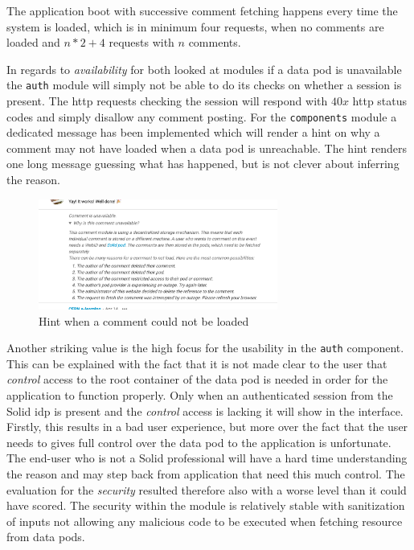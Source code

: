 The application boot with successive comment fetching happens every time the system is loaded, which is in minimum four requests, when no comments are loaded and $n*2+4$ requests with $n$ comments.

In regards to \textit{availability} for both looked at modules if a data pod is unavailable the \texttt{auth} module will simply not be able to do its checks on whether a session is present. The \gls{http} requests checking the session will respond with $40x$ \gls{http} status codes and simply disallow any comment posting. For the \texttt{components} module a dedicated message has been implemented which will render a hint on why a comment may not have loaded when a data pod is unreachable. The hint renders one long message guessing what has happened, but is not clever about inferring the reason.

\begin{figure}[H]
    \centering
    \includegraphics[width=0.7\textwidth]{prototype/poc-comment-unavailable_comment.png}
    \caption{Hint when a comment could not be loaded}
    \label{fig:poc-comment-unavailable_comment}
\end{figure}

Another striking value is the high focus for the usability in the \texttt{auth} component. This can be explained with the fact that it is not made clear to the user that \textit{control} access to the root container of the data pod is needed in order for the application to function properly. Only when an authenticated session from the Solid \gls{idp} is present and the \textit{control} access is lacking it will show in the interface. Firstly, this results in a bad user experience, but more over the fact that the user needs to gives full control over the data pod to the application is unfortunate. The end-user who is not a Solid professional will have a hard time understanding the reason and may step back from application that need this much control. The evaluation for the \textit{security} resulted therefore also with a worse level than it could have scored. The security within the module is relatively stable with sanitization of inputs not allowing any malicious code to be executed when fetching resource from data pods.

